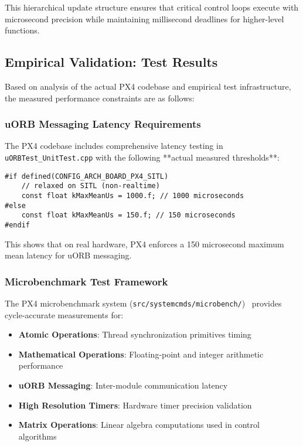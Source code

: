 \documentclass[11pt,a4paper]{article}
\theoremstyle{definition}
\theoremstyle{remark}
\begin{document}
This hierarchical update structure ensures that critical control loops execute with microsecond precision while maintaining millisecond deadlines for higher-level functions.

\subsection{Empirical Validation: Test Results}

Based on analysis of the actual PX4 codebase and empirical test infrastructure, the measured performance constraints are as follows:

\subsubsection{uORB Messaging Latency Requirements}

The PX4 codebase includes comprehensive latency testing in \texttt{uORBTest\_UnitTest.cpp} with the following **actual measured thresholds**:

\begin{verbatim}
#if defined(CONFIG_ARCH_BOARD_PX4_SITL)
    // relaxed on SITL (non-realtime)
    const float kMaxMeanUs = 1000.f; // 1000 microseconds
#else
    const float kMaxMeanUs = 150.f; // 150 microseconds
#endif
\end{verbatim}

This shows that on real hardware, PX4 enforces a 150 microsecond maximum mean latency for uORB messaging.

\subsubsection{Microbenchmark Test Framework}

The PX4 microbenchmark system (\texttt{src/systemcmds/microbench/})~\cite{px4_microbench} provides cycle-accurate measurements for:

\begin{itemize}
\item \textbf{Atomic Operations}: Thread synchronization primitives timing
\item \textbf{Mathematical Operations}: Floating-point and integer arithmetic performance
\item \textbf{uORB Messaging}: Inter-module communication latency
\item \textbf{High Resolution Timers}: Hardware timer precision validation
\item \textbf{Matrix Operations}: Linear algebra computations used in control algorithms
\end{itemize}
\end{document}
